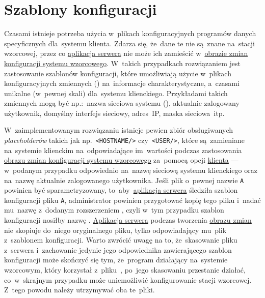 \documentclass[thesis]{subfiles}
\begin{document}

\section{Szablony konfiguracji}

Czasami istnieje potrzeba użycia w~plikach konfiguracyjnych programów danych specyficznych dla~systemu klienta. Zdarza się, że~dane te nie są~znane na~stacji wzorcowej, przez co \hyperref[sec:srv-app]{aplikacja serwera} nie może ich zamieścić w~\hyperref[sec:obraz-zmian-konfiguracji]{obrazie zmian konfiguracji systemu wzorcowego}. W~takich przypadkach rozwiązaniem jest zastosowanie szablonów konfiguracji, które umożliwiają użycie w~plikach konfiguracyjnych zmiennych () na~informacje charakterystyczne, a~czasami unikalne (w~pewnej skali) dla~systemu klienckiego. Przykładami takich zmiennych  mogą być np.:~nazwa sieciowa systemu (), aktualnie zalogowany użytkownik, domyślny interfejs sieciowy, adres~IP, maska sieciowa~itp.

W~zaimplementowanym rozwiązaniu istnieje pewien zbiór obsługiwanych \emph{placeholderów} takich jak np.~\texttt{<HOSTNAME/>} czy~\texttt{<USER/>}, które są~zamieniane na~systemie klienckim na~odpowiadające im~wartości podczas zastosowania \hyperref[sec:obraz-zmian-konfiguracji]{obrazu zmian konfiguracji systemu wzorcowego} za~pomocą opcji \hyperref[sec:cli-app]{klienta}  --- w~podanym przypadku odpowiednio na~nazwę sieciową systemu klienckiego oraz na~nazwę aktualnie zalogowanego użytkownika. Jeśli plik o~pewnej nazwie \texttt{A} powinien być sparametryzowany, to~aby~\hyperref[sec:srv-app]{aplikacja serwera} śledziła szablon konfiguracji pliku \texttt{A}, administrator powinien przygotować kopię tego pliku i~nadać mu~nazwę z~dodanym rozszerzeniem , czyli w~tym przypadku szablon konfiguracji nosiłby nazwę . \hyperref[sec:srv-app]{Aplikacja serwera} podczas tworzenia \hyperref[sec:obraz-zmian-konfiguracji]{obrazu zmian} nie skopiuje do~niego oryginalnego pliku, tylko odpowiadający mu~plik z~szablonem konfiguracji. Warto zwrócić uwagę na to, że~skasowanie pliku  z~serwera i~zachowanie jedynie jego odpowiednika zawierającego szablon konfiguracji może skończyć się tym, że~program działający na~systemie wzorcowym, który korzystał z~pliku~, po~jego skasowaniu przestanie działać, co~w~skrajnym przypadku może uniemożliwić konfigurowanie stacji wzorcowej. Z~tego powodu należy utrzymywać oba te~pliki.
\end{document}
